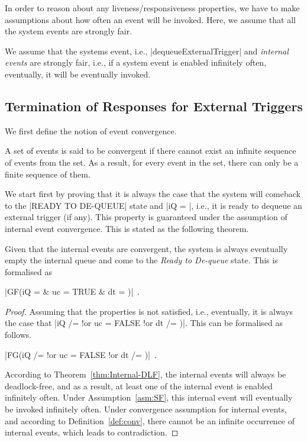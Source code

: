 In order to reason about any liveness/responsiveness properties, we
have to make assumptions about how often an event will be invoked.
Here, we assume that all the system events are strongly fair.
\begin{assumption}
  \label{asm:SF}
  We assume that the systems event, i.e., |dequeueExternalTrigger|
  and \emph{internal events} are strongly fair, i.e., if a system
  event is enabled infinitely often, eventually, it will be eventually
  invoked.
\end{assumption}


\subsection{Termination of Responses for External Triggers}
\label{sec:contr-rema-resp}

We first define the notion of event convergence.
\begin{definition}
  \label{def:conv}
  A set of events is said to be convergent if there cannot exist an
  infinite sequence of events from the set.  As a result, for every
  event in the set, there can only be a finite sequence of them.
\end{definition}

We start first by proving that it is always the case that the system
will comeback to the |READY TO DE-QUEUE| state and |iQ = {}|,
i.e., it is ready to dequeue an external trigger (if any).  This
property is guaranteed under the assumption of internal event
convergence.  This is stated as the following theorem.
\begin{theorem}
  \label{thm:finite-internal-events}
  Given that the internal events are convergent, the system
  is always eventually empty the internal queue and come to the
  \emph{Ready to De-queue} state.  This is formalised as
  \begin{center}
    |GF(iQ = {} & uc = TRUE & dt = {})|~.
  \end{center}
\end{theorem}
\begin{proof}
  Assuming that the properties is not satisfied, i.e., eventually,
  it is always the case that %
  |iQ /= {} !or  uc = FALSE !or dt /=  {})|.  %
  This can be formalised as follows.
  \begin{center}
    |FG(iQ /= {} !or uc = FALSE !or dt /= {})|~.    
  \end{center}
  According to Theorem~\ref{thm:Internal-DLF}, the internal events
  will always be deadlock-free, and as a result, at least one
  of the internal event is enabled infinitely often. Under
  Assumption~\ref{asm:SF}, this internal event will eventually be
  invoked infinitely often.  Under convergence assumption for internal
  events, and according to Definition~\ref{def:conv}, there cannot be
  an infinite occurrence of internal events, which leads to
  contradiction.
\end{proof}


